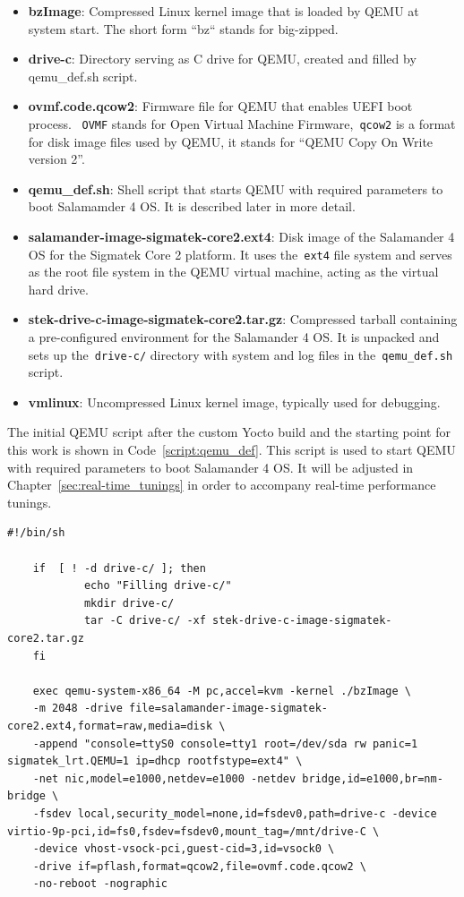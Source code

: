 \documentclass[MMR,Master,english]{style/twbook}
\begin{document}
\begin{itemize}
	\item \textbf{bzImage}: Compressed Linux kernel image that is loaded by QEMU at system start. The short form ``bz`` stands for big-zipped.
	\item \textbf{drive-c}: Directory serving as C drive for QEMU, created and filled by qemu\_def.sh script.
	\item \textbf{ovmf.code.qcow2}: Firmware file for QEMU that enables UEFI boot process. ~\texttt{OVMF} stands for Open Virtual Machine Firmware,~\texttt{qcow2} is a format for disk image files used by QEMU, it stands for ``QEMU Copy On Write version 2''.
	\item \textbf{qemu\_def.sh}: Shell script that starts QEMU with required parameters to boot Salamamder 4 OS. It is described later in more detail.
	\item \textbf{salamander-image-sigmatek-core2.ext4}: Disk image of the Salamander 4 OS for the Sigmatek Core 2 platform. It uses the~\texttt{ext4} file system and serves as the root file system in the QEMU virtual machine, acting as the virtual hard drive.
	\item \textbf{stek-drive-c-image-sigmatek-core2.tar.gz}: Compressed tarball containing a pre-configured environment for the Salamander 4 OS. It is unpacked and sets up the~\texttt{drive-c/} directory with system and log files in the~\texttt{qemu\_def.sh} script.
	\item \textbf{vmlinux}: Uncompressed Linux kernel image, typically used for debugging.
\end{itemize}

\noindent The initial QEMU script after the custom Yocto build and the starting point for this work is shown in Code~\ref{script:qemu_def}. This script is used to start QEMU with required parameters to boot Salamander 4 OS. It will be adjusted in Chapter~\ref{sec:real-time_tunings} in order to accompany real-time performance tunings.

\vspace{2em}
\begin{lstlisting}[name={QEMU script for starting Salamander 4 Virtualization},label={script:qemu_def}]
	#!/bin/sh

	if  [ ! -d drive-c/ ]; then
			echo "Filling drive-c/"
			mkdir drive-c/
			tar -C drive-c/ -xf stek-drive-c-image-sigmatek-core2.tar.gz
	fi
		
	exec qemu-system-x86_64 -M pc,accel=kvm -kernel ./bzImage \
	-m 2048 -drive file=salamander-image-sigmatek-core2.ext4,format=raw,media=disk \
	-append "console=ttyS0 console=tty1 root=/dev/sda rw panic=1 sigmatek_lrt.QEMU=1 ip=dhcp rootfstype=ext4" \
	-net nic,model=e1000,netdev=e1000 -netdev bridge,id=e1000,br=nm-bridge \
	-fsdev local,security_model=none,id=fsdev0,path=drive-c -device virtio-9p-pci,id=fs0,fsdev=fsdev0,mount_tag=/mnt/drive-C \
	-device vhost-vsock-pci,guest-cid=3,id=vsock0 \
	-drive if=pflash,format=qcow2,file=ovmf.code.qcow2 \
	-no-reboot -nographic
\end{lstlisting}
\vspace{2em}
\end{document}
